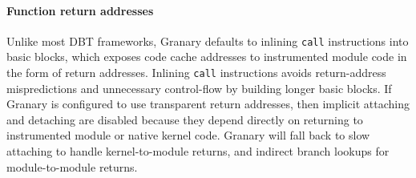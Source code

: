 \documentclass[preprint]{sigplanconf}
\begin{document}


\vspace{-3pt}\paragraph{Function return addresses}\label{para:return_address_transparency} Unlike most DBT frameworks, Granary defaults to inlining \texttt{call} instructions into basic blocks, which exposes code cache addresses to instrumented module code in the form of return addresses. Inlining \texttt{call} instructions avoids return-address mispredictions and unnecessary control-flow by building longer basic blocks. If Granary is configured to use transparent return addresses, then implicit attaching and detaching are disabled because they depend directly on returning to instrumented module or native kernel code. Granary will fall back to slow attaching to handle kernel-to-module returns, and indirect branch lookups for module-to-module returns.
\end{document}
